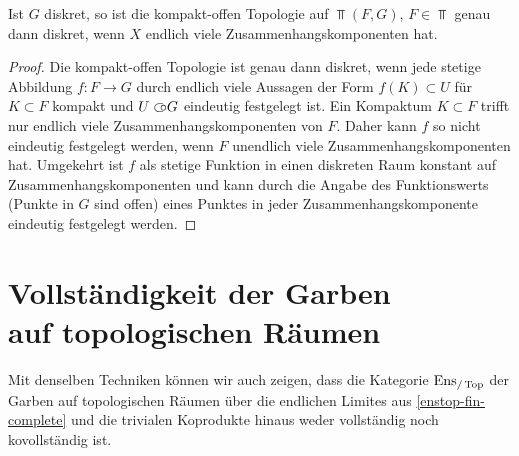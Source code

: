 \begin{lemma} \label{compact-open-discrete}
  Ist $G$ diskret, so ist die kompakt-offen Topologie auf $\Top(F,
  G)$, $F \in \Top$ genau dann diskret, wenn $X$ endlich viele
  Zusammenhangskomponenten hat.
\end{lemma}
\begin{proof}
  Die kompakt-offen Topologie ist genau dann diskret, wenn jede
  stetige Abbildung $f: F \to G$ durch endlich viele Aussagen der Form
  $f(K) \subset U$ für $K \subset F$ kompakt und $U \subset\kern-0.58em\circ G$ eindeutig
  festgelegt ist. Ein Kompaktum $K \subset F$ trifft nur endlich viele
  Zusammenhangskomponenten von $F$. Daher kann $f$ so nicht eindeutig
  festgelegt werden, wenn $F$ unendlich viele Zusammenhangskomponenten
  hat. Umgekehrt ist $f$ als stetige Funktion in einen diskreten Raum
  konstant auf Zusammenhangskomponenten und kann durch die Angabe des
  Funktionswerts (Punkte in $G$ sind offen) eines Punktes in jeder
  Zusammenhangskomponente eindeutig festgelegt werden.
\end{proof}

\section[Vollständigkeit der Garben auf topologischen Räumen]
        {\texorpdfstring
          {Vollständigkeit der Garben\\auf topologischen Räumen}
          {Vollständigkeit der Garben auf topologischen Räumen}
          }
\label{sec:enstop-completeness}

Mit denselben Techniken können wir auch zeigen, dass die Kategorie
$\operatorname{Ens}_{/\operatorname{Top}}$ der Garben auf topologischen Räumen über die endlichen
Limites aus \ref{enstop-fin-complete} und die trivialen Koprodukte
hinaus weder vollständig noch kovollständig ist.

